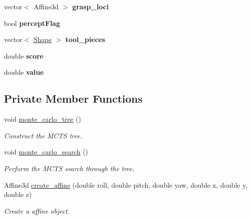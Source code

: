 \begin{DoxyCompactItemize}
vector$<$ Affine3d $>$ {\bfseries grasp\+\_\+loci}
\item 
\mbox{\label{classMCT__Search_a915954e9c2eec4575ef471d6b9e63131}} 
bool {\bfseries percept\+Flag}
\item 
\mbox{\label{classMCT__Search_a52862592a8434d994e532b317865d3a1}} 
vector$<$ \hyperlink{structShape}{Shape} $>$ {\bfseries tool\+\_\+pieces}
\item 
\mbox{\label{classMCT__Search_ad9bb664cc6034bafbf2be3d78e3104e9}} 
double {\bfseries score}
\item 
\mbox{\label{classMCT__Search_a82027b2cde6e6f14e0e6477457894a0f}} 
double {\bfseries value}
\end{DoxyCompactItemize}
\subsection*{Private Member Functions}
\begin{DoxyCompactItemize}
\item 
\mbox{\label{classMCT__Search_acadb67d79aeb9d34f2cdf84cdf04fe90}} 
void \hyperlink{classMCT__Search_acadb67d79aeb9d34f2cdf84cdf04fe90}{monte\+\_\+carlo\+\_\+tree} ()
\begin{DoxyCompactList}\small\item\em Construct the M\+C\+TS tree. \end{DoxyCompactList}\item 
\mbox{\label{classMCT__Search_a166ce840528453337d649d1b337bb95c}} 
void \hyperlink{classMCT__Search_a166ce840528453337d649d1b337bb95c}{monte\+\_\+carlo\+\_\+search} ()
\begin{DoxyCompactList}\small\item\em Perform the M\+C\+TS search through the tree. \end{DoxyCompactList}\item 
Affine3d \hyperlink{classMCT__Search_a257afef600f88f324a253be66209823c}{create\+\_\+affine} (double roll, double pitch, double yaw, double x, double y, double z)
\begin{DoxyCompactList}\small\item\em Create a affine object. \end{DoxyCompactList}\end{DoxyCompactItemize}
